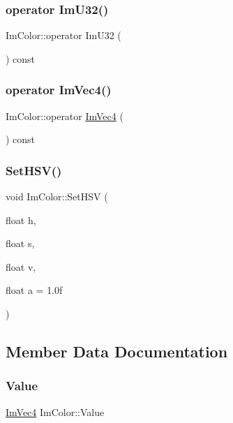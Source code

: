 \hypertarget{struct_im_color_a4f4fc53e0676d50404d6d5ffcf16637f}{}\label{struct_im_color_a4f4fc53e0676d50404d6d5ffcf16637f} 
\subsubsection{\texorpdfstring{operator Im\+U32()}{operator ImU32()}}
{\footnotesize\ttfamily Im\+Color\+::operator Im\+U32 (\begin{DoxyParamCaption}{ }\end{DoxyParamCaption}) const}

\hypertarget{struct_im_color_a10f1de242f13c93f8be64545e4cbcb0a}{}\label{struct_im_color_a10f1de242f13c93f8be64545e4cbcb0a} 
\subsubsection{\texorpdfstring{operator Im\+Vec4()}{operator ImVec4()}}
{\footnotesize\ttfamily Im\+Color\+::operator \hyperlink{struct_im_vec4}{Im\+Vec4} (\begin{DoxyParamCaption}{ }\end{DoxyParamCaption}) const}

\hypertarget{struct_im_color_afcff20160db703b956d56e5a9fa88e24}{}\label{struct_im_color_afcff20160db703b956d56e5a9fa88e24} 
\subsubsection{\texorpdfstring{Set\+H\+S\+V()}{SetHSV()}}
{\footnotesize\ttfamily void Im\+Color\+::\+Set\+H\+SV (\begin{DoxyParamCaption}\item[{float}]{h,  }\item[{float}]{s,  }\item[{float}]{v,  }\item[{float}]{a = {\ttfamily 1.0f} }\end{DoxyParamCaption})}



\subsection{Member Data Documentation}
\hypertarget{struct_im_color_a4cf43bd58e30decaa0248f839fc85e95}{}\label{struct_im_color_a4cf43bd58e30decaa0248f839fc85e95} 
\subsubsection{\texorpdfstring{Value}{Value}}
{\footnotesize\ttfamily \hyperlink{struct_im_vec4}{Im\+Vec4} Im\+Color\+::\+Value}

